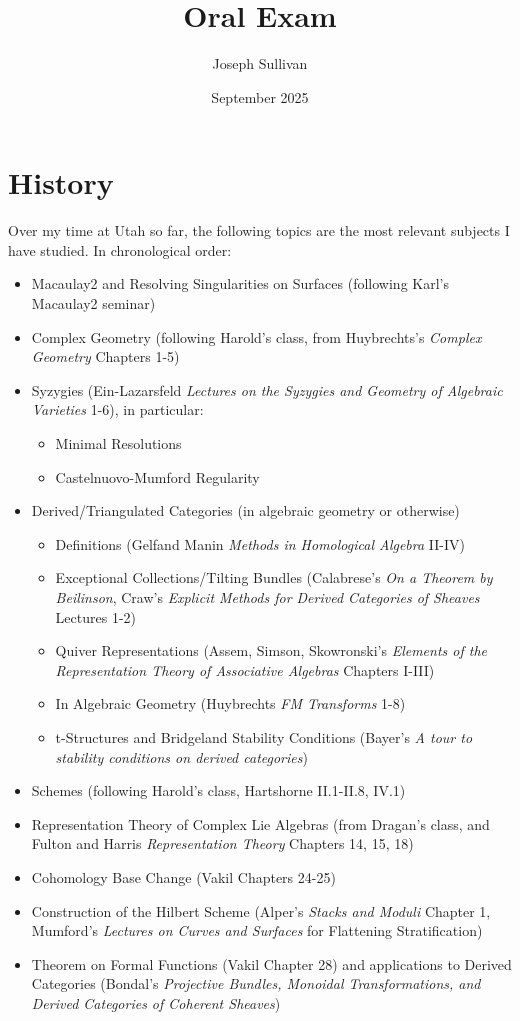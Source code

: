 \documentclass[12pt]{article}
\title{Oral Exam}
\author{Joseph Sullivan}
\date{September 2025}
\begin{document}
\maketitle

\section{History}

Over my time at Utah so far, the following topics are the most relevant subjects I have studied. In chronological order:
\begin{itemize}
    \item Macaulay2 and Resolving Singularities on Surfaces (following Karl's Macaulay2 seminar)
    \item Complex Geometry (following Harold's class, from Huybrechts's \textit{Complex Geometry} Chapters 1-5)
    \item Syzygies (Ein-Lazarsfeld \textit{Lectures on the Syzygies and Geometry of Algebraic Varieties} 1-6), in particular:
    \begin{itemize}
        \item Minimal Resolutions
        \item Castelnuovo-Mumford Regularity
    \end{itemize}
    \item Derived/Triangulated Categories (in algebraic geometry or otherwise)
    \begin{itemize}
        \item Definitions (Gelfand Manin \textit{Methods in Homological Algebra} II-IV)
        \item Exceptional Collections/Tilting Bundles (Calabrese's \textit{On a Theorem by Beilinson}, Craw's \textit{Explicit Methods for Derived Categories of Sheaves} Lectures 1-2)
        \item Quiver Representations (Assem, Simson, Skowronski's \textit{Elements of the Representation Theory of Associative Algebras} Chapters I-III)
        \item In Algebraic Geometry (Huybrechts \textit{FM Transforms} 1-8)
        \item t-Structures and Bridgeland Stability Conditions (Bayer's \textit{A tour to stability conditions on derived categories})
    \end{itemize}
    \item Schemes (following Harold's class, Hartshorne II.1-II.8, IV.1)
    \item Representation Theory of Complex Lie Algebras (from Dragan's class, and Fulton and Harris \textit{Representation Theory} Chapters 14, 15, 18)
    \item Cohomology Base Change (Vakil Chapters 24-25)
    \item Construction of the Hilbert Scheme (Alper's \textit{Stacks and Moduli} Chapter 1, Mumford's \textit{Lectures on Curves and Surfaces} for Flattening Stratification)
    \item Theorem on Formal Functions (Vakil Chapter 28) and applications to Derived Categories (Bondal's \textit{Projective Bundles, Monoidal Transformations, and Derived Categories of Coherent Sheaves})
\end{itemize}
\end{document}
